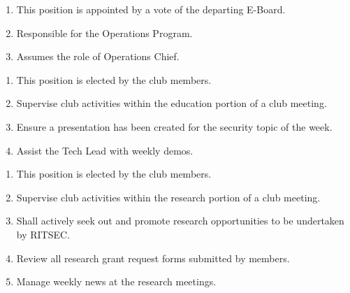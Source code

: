 \begin{enumerate}
  \item This position is appointed by a vote of the departing E-Board.
  \item Responsible for the Operations Program.
  \item Assumes the role of Operations Chief.
\end{enumerate}


\begin{enumerate}
  \item This position is elected by the club members.
  \item Supervise club activities within the education portion of a club meeting.
  \item Ensure a presentation has been created for the security topic of the week.
  \item Assist the Tech Lead with weekly demos.
\end{enumerate}


\begin{enumerate}
  \item This position is elected by the club members.
  \item Supervise club activities within the research portion of a club meeting.
  \item Shall actively seek out and promote research opportunities to be undertaken by RITSEC.
  \item Review all research grant request forms submitted by members. 
  \item Manage weekly news at the research meetings.
\end{enumerate}
